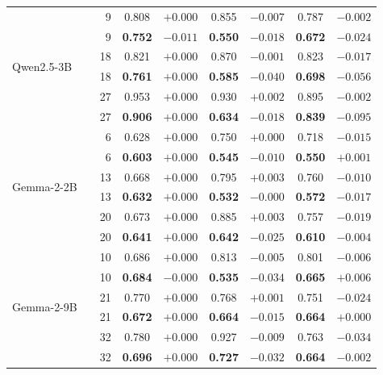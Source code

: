 \begin{table}[t]
\begin{tabular}{llr|cc|cc|cc}
\midrule
\multirow{6}{*}{Qwen2.5-3B}
 & \AmbGCE{}          & 9  & 0.808 & $+0.000$ & 0.855 & $-0.007$ & 0.787 & $-0.002$ \\
 & \textbf{\TanGCE{}} & 9  & \textbf{0.752} & $-0.011$ & \textbf{0.550} & $-0.018$ & \textbf{0.672} & $-0.024$ \\
 & \AmbGCE{}          & 18 & 0.821 & $+0.000$ & 0.870 & $-0.001$ & 0.823 & $-0.017$ \\
 & \textbf{\TanGCE{}} & 18 & \textbf{0.761} & $+0.000$ & \textbf{0.585} & $-0.040$ & \textbf{0.698} & $-0.056$ \\
 & \AmbGCE{}          & 27 & 0.953 & $+0.000$ & 0.930 & $+0.002$ & 0.895 & $-0.002$ \\
 & \textbf{\TanGCE{}} & 27 & \textbf{0.906} & $+0.000$ & \textbf{0.634} & $-0.018$ & \textbf{0.839} & $-0.095$ \\
\midrule
\multirow{6}{*}{Gemma-2-2B}
 & \AmbGCE{}          & 6  & 0.628 & $+0.000$ & 0.750 & $+0.000$ & 0.718 & $-0.015$ \\
 & \textbf{\TanGCE{}} & 6  & \textbf{0.603} & $+0.000$ & \textbf{0.545} & $-0.010$ & \textbf{0.550} & $+0.001$ \\
 & \AmbGCE{}          & 13 & 0.668 & $+0.000$ & 0.795 & $+0.003$ & 0.760 & $-0.010$ \\
 & \textbf{\TanGCE{}} & 13 & \textbf{0.632} & $+0.000$ & \textbf{0.532} & $-0.000$ & \textbf{0.572} & $-0.017$ \\
 & \AmbGCE{}          & 20 & 0.673 & $+0.000$ & 0.885 & $+0.003$ & 0.757 & $-0.019$ \\
 & \textbf{\TanGCE{}} & 20 & \textbf{0.641} & $+0.000$ & \textbf{0.642} & $-0.025$ & \textbf{0.610} & $-0.004$ \\
\midrule
\multirow{6}{*}{Gemma-2-9B}
 & \AmbGCE{}          & 10 & 0.686 & $+0.000$ & 0.813 & $-0.005$ & 0.801 & $-0.006$ \\
 & \textbf{\TanGCE{}} & 10 & \textbf{0.684} & $-0.000$ & \textbf{0.535} & $-0.034$ & \textbf{0.665} & $+0.006$ \\
 & \AmbGCE{}          & 21 & 0.770 & $+0.000$ & 0.768 & $+0.001$ & 0.751 & $-0.024$ \\
 & \textbf{\TanGCE{}} & 21 & \textbf{0.672} & $+0.000$ & \textbf{0.664} & $-0.015$ & \textbf{0.664} & $+0.000$ \\
 & \AmbGCE{}          & 32 & 0.780 & $+0.000$ & 0.927 & $-0.009$ & 0.763 & $-0.034$ \\
 & \textbf{\TanGCE{}} & 32 & \textbf{0.696} & $+0.000$ & \textbf{0.727} & $-0.032$ & \textbf{0.664} & $-0.002$ \\

\end{tabular}
\end{table}
